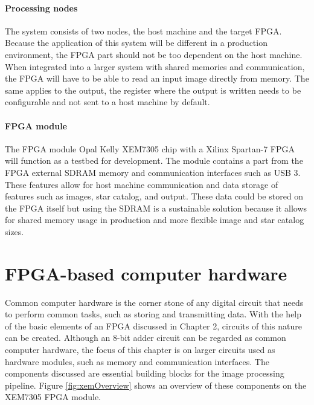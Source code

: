 \documentclass[12pt]{report}
\begin{document}
\subsubsection{Processing nodes}
The system consists of two nodes, the host machine and the target FPGA. Because the application of this system will be different in a production environment, the FPGA part should not be too dependent on the host machine. When integrated into a larger system with shared memories and communication, the FPGA will have to be able to read an input image directly from memory. The same applies to the output, the register where the output is written needs to be configurable and not sent to a host machine by default.

\subsubsection{FPGA module}
The FPGA module Opal Kelly XEM7305 chip with a Xilinx Spartan-7 FPGA will function as a testbed for development. The module contains a part from the FPGA external SDRAM memory and communication interfaces such as USB 3. These features allow for host machine communication and data storage of features such as images, star catalog, and output. These data could be stored on the FPGA itself but using the SDRAM is a sustainable solution because it allows for shared memory usage in production and more flexible image and star catalog sizes.


\chapter{FPGA-based computer hardware}
Common computer hardware is the corner stone of any digital circuit that needs to perform common tasks, such as storing and transmitting data. With the help of the basic elements of an FPGA discussed in Chapter 2, circuits of this nature can be created. Although an 8-bit adder circuit can be regarded as common computer hardware, the focus of this chapter is on larger circuits used as hardware modules, such as memory and communication interfaces. The components discussed are essential building blocks for the image processing pipeline. Figure \ref{fig:xemOverview} shows an overview of these components on the XEM7305 FPGA module.
\end{document}
